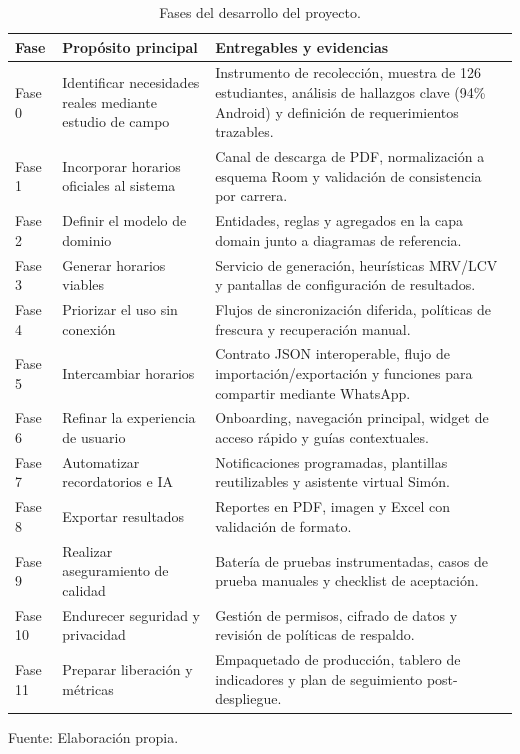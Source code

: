 \begin{table}[H]
\centering
\begin{tabularx}{\linewidth}{@{}p{1.2cm}p{3.9cm}>{\RaggedRight\arraybackslash}X@{}}
\toprule
Fase & Propósito principal & Entregables y evidencias \\
\midrule
Fase 0 & Identificar necesidades reales mediante estudio de campo & Instrumento de recolección, muestra de 126 estudiantes, análisis de hallazgos clave (94\% Android) y definición de requerimientos trazables. \\
Fase 1 & Incorporar horarios oficiales al sistema & Canal de descarga de PDF, normalización a esquema Room y validación de consistencia por carrera. \\
Fase 2 & Definir el modelo de dominio & Entidades, reglas y agregados en la capa domain junto a diagramas de referencia. \\
Fase 3 & Generar horarios viables & Servicio de generación, heurísticas MRV/LCV y pantallas de configuración de resultados. \\
Fase 4 & Priorizar el uso sin conexión & Flujos de sincronización diferida, políticas de frescura y recuperación manual. \\
Fase 5 & Intercambiar horarios & Contrato JSON interoperable, flujo de importación/exportación y funciones para compartir mediante WhatsApp. \\
Fase 6 & Refinar la experiencia de usuario & Onboarding, navegación principal, widget de acceso rápido y guías contextuales. \\
Fase 7 & Automatizar recordatorios e IA & Notificaciones programadas, plantillas reutilizables y asistente virtual Simón. \\
Fase 8 & Exportar resultados & Reportes en PDF, imagen y Excel con validación de formato. \\
Fase 9 & Realizar aseguramiento de calidad & Batería de pruebas instrumentadas, casos de prueba manuales y checklist de aceptación. \\
Fase 10 & Endurecer seguridad y privacidad & Gestión de permisos, cifrado de datos y revisión de políticas de respaldo. \\
Fase 11 & Preparar liberación y métricas & Empaquetado de producción, tablero de indicadores y plan de seguimiento post-despliegue. \\
\bottomrule
\end{tabularx}
\caption{Fases del desarrollo del proyecto.}\label{tab:fases_metodologia}
Fuente: Elaboración propia.
\end{table}

